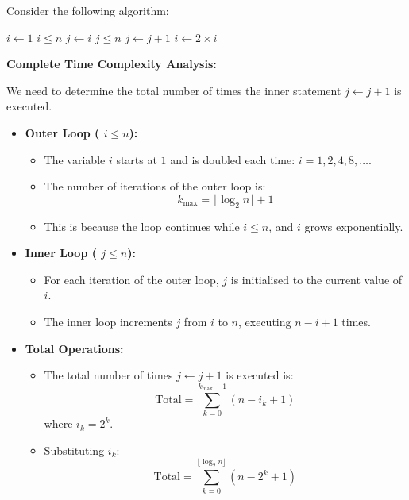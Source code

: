 \begin{example}

    Consider the following algorithm:
    
    \begin{codebox}
        \li $i \gets 1$
        \li \While $i \leq n$ \Do
        \li     $j \gets i$
        \li     \While $j \leq n$ \Do
        \li         $j \gets j + 1$
                \End
        \li     $i \gets 2 \times i$
            \End
    \end{codebox}
    
    \textbf{Complete Time Complexity Analysis:}
    
    We need to determine the total number of times the inner statement $j \gets j + 1$ is executed.
    
    \begin{itemize}
        \item \textbf{Outer Loop (\texttt{\While} $i \leq n$):}
        \begin{itemize}
            \item The variable $i$ starts at $1$ and is doubled each time: $i = 1, 2, 4, 8, \ldots$.
            \item The number of iterations of the outer loop is:
            \[ k_{\text{max}} = \lfloor \log_2 n \rfloor + 1 \]
            \item This is because the loop continues while $i \leq n$, and $i$ grows exponentially.
        \end{itemize}
        \item \textbf{Inner Loop (\texttt{\While} $j \leq n$):}
        \begin{itemize}
            \item For each iteration of the outer loop, $j$ is initialised to the current value of $i$.
            \item The inner loop increments $j$ from $i$ to $n$, executing $n - i + 1$ times.
        \end{itemize}
        \item \textbf{Total Operations:}
        \begin{itemize}
            \item The total number of times $j \gets j + 1$ is executed is:
            \[
            \text{Total} = \sum_{k=0}^{k_{\text{max}} - 1} (n - i_k + 1)
            \]
            where $i_k = 2^k$.
            \item Substituting $i_k$:
            \[
            \text{Total} = \sum_{k=0}^{\lfloor \log_2 n \rfloor} (n - 2^k + 1)
\]
\end{itemize}
\end{itemize}
\end{example}

